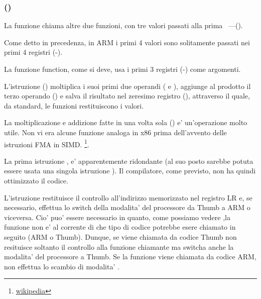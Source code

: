 \subsubsection{\NonOptimizingKeilVI (\ARMMode)}



La funzione \main chiama altre due funzioni, con tre valori passati alla prima ~---(\ttf).

Come detto in precedenza, in ARM i primi 4 valori sono solitamente passati nei primi 4 registri (-).

La funzione \ttf function, come si deve, usa i primi 3 registri (-) come argomenti.

L'istruzione  () 
moltiplica i suoi primi due operandi ( e ), aggiunge al prodotto il terzo operando () e salva il risultato
nel zeresimo registro (), attraverso il quale, da standard, le funzioni restituiscono i valori.

La moltiplicazione e addizione fatte in una volta sola () e' un'operazione molto utile. 
Non vi era alcune funzione analoga in x86 prima dell'avvento delle istruzioni FMA in SIMD.
\footnote{\href{http://go.yurichev.com/17103}{wikipedia}}.

La prima istruzione , 
e' apparentemente ridondante (al suo posto sarebbe potuta essere usata una singola istruzione ). 
Il compilatore, come previsto, non ha quindi ottimizzato il codice.


L'istruzione  restituisce il controllo all'indirizzo memorizzato nel registro \ac{LR} e, se necessario, 
effettua lo switch della modalita' del processore da Thumb a ARM o viceversa.
Cio' puo' essere necessario in quanto, come possiamo vedere ,la funzione \ttf non e' al corrente di che tipo di codice potrebbe esere chiamato in seguito (ARM o Thumb).
Dunque, se viene chiamata da codice Thumb  non resituisce soltanto il controllo alla funzione chiamante ma switcha anche la modalita' del processore a Thumb. 
Se la funzione viene chiamata da codice ARM, non effettua lo scambio di modalita' .
